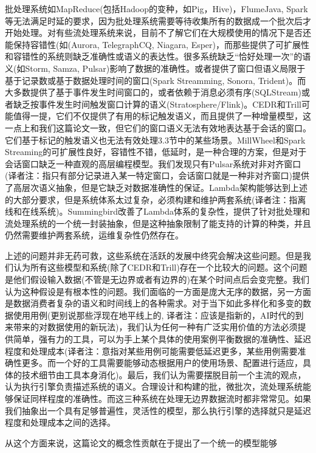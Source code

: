 \documentclass[oneside]{ctexbook}
\begin{document}
批处理系统如MapReduce(包括Hadoop的变种，如Pig，Hive)，FlumeJava, Spark等无法满足时延的要求，因为批处理系统需要等待收集所有的数据成一个批次后才开始处理。对有些流处理系统来说，目前不了解它们在大规模使用的情况下是否还能保持容错性(如(Aurora, TelegraphCQ, Niagara, Esper)，而那些提供了可扩展性和容错性的系统则缺乏准确性或语义的表达性。很多系统缺乏“恰好处理一次”的语义(如Storm, Samza, Pulsar)影响了数据的准确性。或者提供了窗口但语义局限于基于记录数或基于数据处理时间的窗口(Spark Streamming, Sonora, Trident)。而大多数提供了基于事件发生时间窗口的，或者依赖于消息必须有序(SQLStream)或者缺乏按事件发生时间触发窗口计算的语义(Stratosphere/Flink)。CEDR和Trill可能值得一提，它们不仅提供了有用的标记触发语义，而且提供了一种增量模型，这一点上和我们这篇论文一致，但它们的窗口语义无法有效地表达基于会话的窗口。它们基于标记的触发语义也无法有效处理3.3节中的某些场景。MillWheel和Spark Streaming的可扩展性良好，容错性不错，低延时，是一种合理的方案，但是对于会话窗口缺乏一种直观的高层编程模型。我们发现只有Pulsar系统对非对齐窗口(译者注：指只有部分记录进入某一特定窗口，会话窗口就是一种非对齐窗口)提供了高层次语义抽象，但是它缺乏对数据准确性的保证。Lambda架构能够达到上述的大部分要求，但是系统体系太过复杂，必须构建和维护两套系统(译者注：指离线和在线系统)。Summingbird改善了Lambda体系的复杂性，提供了针对批处理和流处理系统的一个统一封装抽象，但是这种抽象限制了能支持的计算的种类，并且仍然需要维护两套系统，运维复杂性仍然存在。

上述的问题并非无药可救，这些系统在活跃的发展中终究会解决这些问题。但是我们认为所有这些模型和系统(除了CEDR和Trill)存在一个比较大的问题。这个问题是他们假设输入数据(不管是无边界或者有边界的)在某个时间点后会变完整。我们认为这种假设是有根本性的问题。我们面临的一方面是庞大无序的数据，另一方面是数据消费者复杂的语义和时间线上的各种需求。对于当下如此多样化和多变的数据使用用例(更别说那些浮现在地平线上的, 译者注：应该是指新的，AI时代的到来带来的对数据使用的新玩法)，我们认为任何一种有广泛实用价值的方法必须提供简单，强有力的工具，可以为手上某个具体的使用案例平衡数据的准确性、延迟程度和处理成本(译者注：意指对某些用例可能需要低延迟更多，某些用例需要准确性更多。而一个好的工具需要能够动态根据用户的使用场景、配置进行适应，具体的技术细节由工具本身消化)。最后，我们认为需要摆脱目前一个主流的观点，认为执行引擎负责描述系统的语义。合理设计和构建的批，微批次，流处理系统能够保证同样程度的准确性。而这三种系统在处理无边界数据流时都非常常见。如果我们抽象出一个具有足够普遍性，灵活性的模型，那么执行引擎的选择就只是延迟程度和处理成本之间的选择。

从这个方面来说，这篇论文的概念性贡献在于提出了一个统一的模型能够
\end{document}
